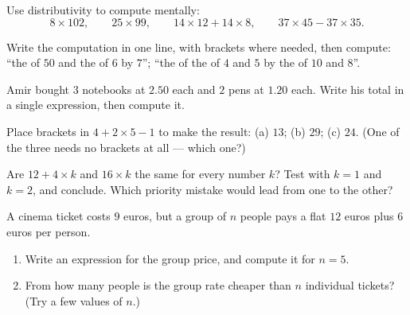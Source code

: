 \begin{exercise}[$\star$]\label{exo:g7:priorities:5}
Use distributivity to compute mentally:
\[
8 \times 102, \qquad
25 \times 99, \qquad
14 \times 12 + 14 \times 8, \qquad
37 \times 45 - 37 \times 35 .
\]
\end{exercise}

\begin{exercise}[$\star$]\label{exo:g7:priorities:6}
Write the computation in one line, with brackets where needed, then
compute: ``the  of $50$ and the  of $6$ by $7$'';
``the  of the  of $4$ and $5$ by the  of $10$ and
$8$''.
\end{exercise}

\begin{exercise}[$\star$]\label{exo:g7:priorities:7}
Amir bought $3$ notebooks at $2.50$ each and $2$ pens at $1.20$ each.
Write his total in a single expression, then compute it.
\end{exercise}

\begin{exercise}[$\star\star$]\label{exo:g7:priorities:8}
Place brackets in $4 + 2 \times 5 - 1$ to make the result: (a) $13$;
(b) $29$; (c) $24$. (One of the three needs no brackets at all ---
which one?)
\end{exercise}

\begin{exercise}[$\star\star$]\label{exo:g7:priorities:9}
Are $12 + 4 \times k$ and $16 \times k$ the same for every number $k$?
Test with $k = 1$ and $k = 2$, and conclude. Which priority mistake
would lead from one to the other?
\end{exercise}

\begin{exercise}[$\star\star$]\label{exo:g7:priorities:10}
A cinema ticket costs $9$ euros, but a group of $n$ people pays a flat
$12$ euros plus $6$ euros per person.
\begin{enumerate}
  \item Write an expression for the group price, and compute it for
        $n = 5$.
  \item From how many people is the group rate cheaper than $n$
        individual tickets? (Try a few values of $n$.)
\end{enumerate}
\end{exercise}

